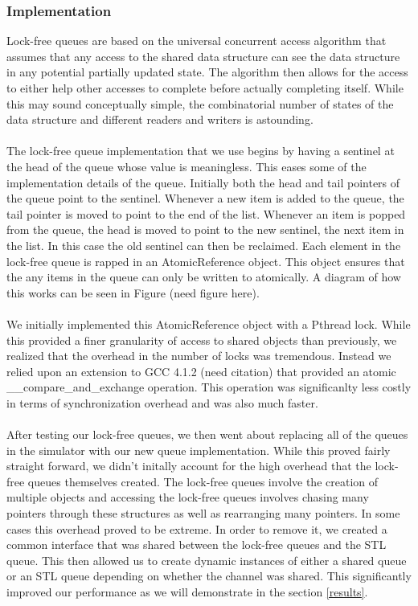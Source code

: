 \documentclass{article}
\begin{document}
\begin{multicols}{2}
\subsubsection{Implementation}
Lock-free queues are based on the universal concurrent access algorithm
\cite{LF} that assumes that any access to the shared data structure can
see the data structure in any potential partially updated state.  The
algorithm then allows for the access to either help other accesses to
complete before actually completing itself.  While this may sound
conceptually simple, the combinatorial number of states of the data
structure and different readers and writers is astounding.\\
~\\
The lock-free queue implementation that we use begins by having a sentinel
at the head of the queue whose value is meaningless.  This eases some of
the implementation details of the queue.  Initially both the head and tail
pointers of the queue point to the sentinel.  Whenever a new item is added
to the queue, the tail pointer is moved to point to the end of the list.
Whenever an item is popped from the queue, the head is moved to point to
the new sentinel, the next item in the list.  In this case the old
sentinel can then be reclaimed.  Each element in the lock-free queue is
rapped in an AtomicReference object.  This object ensures that the any
items in the queue can only be written to atomically.  A diagram of how
this works can be seen in Figure (need figure here).\\
~\\
We initially implemented this AtomicReference object with a Pthread
lock.  While this provided a finer granularity of access to shared
objects than previously, we realized that the overhead in the number of
locks was tremendous.  Instead we relied upon an extension to GCC 4.1.2
(need citation) that provided an atomic \_\_compare\_and\_exchange operation.
This operation was significanlty less costly in terms of synchronization
overhead and was also much faster.\\
~\\
After testing our lock-free queues, we then went about replacing all of
the queues in the simulator with our new queue implementation.  While this
proved fairly straight forward, we didn't initally account for the high
overhead that the lock-free queues themselves created.  The lock-free
queues involve the creation of multiple objects and accessing the
lock-free queues involves chasing many pointers through these structures
as well as rearranging many pointers.  In some cases this overhead proved
to be extreme.  In order to remove it, we created a common interface that
was shared between the lock-free queues and the STL queue.  This then
allowed us to create dynamic instances of either a shared queue or an STL
queue depending on whether the channel was shared.  This significantly
improved our performance as we will demonstrate in the section \ref{results}.


\end{multicols}
\end{document}
